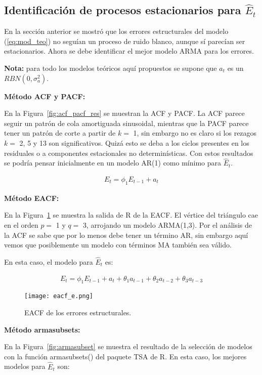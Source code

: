 \documentclass[11pt, letterpaper, twoside]{article}
\begin{document}
\subsection{Identificación de procesos estacionarios para $\hat{E}_t$}

En la sección anterior se mostró que los errores estructurales del modelo (\ref{eq:mod_teo}) no seguían un proceso de ruido blanco, aunque sí parecían ser estacionarios. Ahora se debe identificar el mejor modelo ARMA para los errores.

\textbf{Nota:} para todo los modelos teóricos aquí propuestos se supone que $a_t$ es un $RBN(0,\sigma_a^2)$.

\textbf{Método ACF y PACF:}

En la Figura~\ref{fig:acf_pacf_res} se muestran la ACF y PACF. La ACF parece seguir un patrón de cola amortiguada sinusoidal, mientras que la PACF parece tener un patrón de corte a partir de $k=$ 1, sin embargo no es claro si los rezagos $k=$ 2, 5 y 13 son significativos. Quizá esto se deba a los ciclos presentes en los residuales o a componentes estacionales no determinísticas. Con estos resultados se podría pensar inicialmente en un modelo AR(1) como mínimo para $\hat{E}_t$.

\begin{align}
\label{eq:mod_err_acf}
    E_t = \phi_1 E_{t-1} + a_t
\end{align}

\textbf{Método EACF:}

En la Figura~\ref{fig:eacf} se muestra la salida de R de la EACF. El vértice del triángulo cae en el orden $p=$ 1 y $q=$ 3, arrojando un modelo ARMA(1,3). Por el análisis de la ACF se sabe que por lo menos debe tener un término AR, sin embargo aquí vemos que posiblemente un modelo con términos MA también sea válido.

En esta caso, el modelo para $\hat{E}_t$ es:

\begin{align}
\label{eq:mod_err_eacf}
    E_t = \phi_1 E_{t-1} + a_t + \theta_1 a_{t-1} + \theta_2 a_{t-2} + \theta_3 a_{t-3}
\end{align}

\begin{figure}[h!]
\centering
\texttt{[image: eacf\_e.png]}
\caption{EACF de los errores estructurales.}
\label{fig:eacf}
\end{figure}

\textbf{Método armasubsets:}

En la Figura~\ref{fig:armasubset} se muestra el resultado de la selección de modelos con la función armasubsets() del paquete TSA de R. En esta caso, los mejores modelos para $\hat{E}_t$ son:
\end{document}
